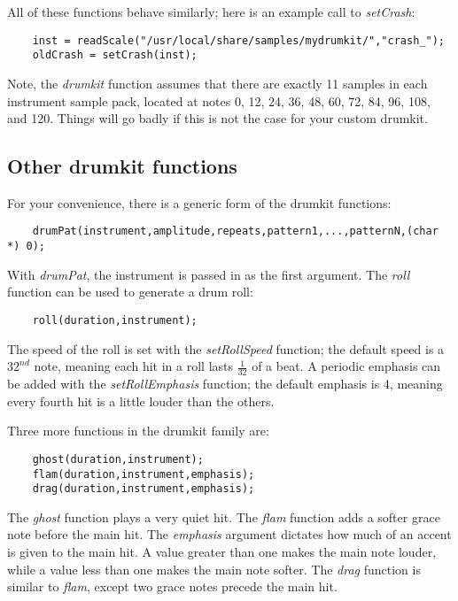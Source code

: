 \documentclass{article}
\begin{document}
All of these functions behave similarly; here is an example call to
{\it setCrash}:

\begin{verbatim}
    inst = readScale("/usr/local/share/samples/mydrumkit/","crash_");
    oldCrash = setCrash(inst);
\end{verbatim}

Note, the {\it drumkit} function assumes that there are exactly 11 samples
in each instrument sample pack, located at notes 0, 12, 24, 36, 48, 60, 72, 84,
96, 108, and 120. Things will go badly if this is not the case for
your custom drumkit.

\subsection*{Other drumkit functions}

For your convenience, there is a generic form of the drumkit functions:

\begin{verbatim}
    drumPat(instrument,amplitude,repeats,pattern1,...,patternN,(char *) 0);
\end{verbatim}

With {\it drumPat}, the instrument is passed in as the first argument.
The {\it roll} function can be used to generate a drum roll:

\begin{verbatim}
    roll(duration,instrument);
\end{verbatim}

The speed of the roll is set with the {\it setRollSpeed} function;
the default speed is a $32^{nd}$ note, meaning
each hit in a roll lasts $\frac{1}{32}$ of a beat.
A periodic emphasis can be added with the {\it setRollEmphasis} function;
the default emphasis is 4, meaning every fourth hit is a little louder
than the others.

Three more functions in the drumkit family are:

\begin{verbatim}
    ghost(duration,instrument);
    flam(duration,instrument,emphasis);
    drag(duration,instrument,emphasis);
\end{verbatim}

The {\it ghost} function plays a very quiet hit.
The {\it flam} function adds a softer grace note before the main hit. 
The {\it emphasis} argument dictates how much of an accent is given to
the main hit. A value greater than one makes the main note louder,
while a value less than one makes the main note softer.
The {\it drag} function is similar to {\it flam}, except two grace notes precede
the main hit.
\end{document}
